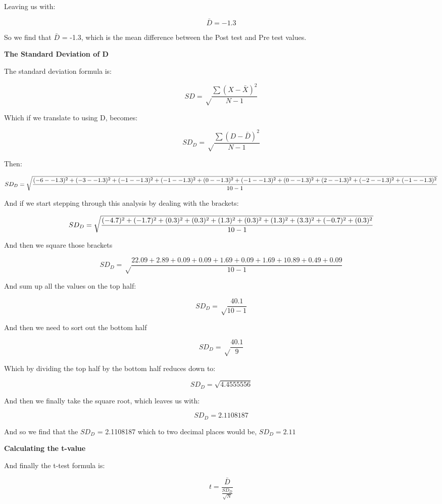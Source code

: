 \documentclass[
  oneside]{book}
\begin{document}
Leaving us with:

\[\bar{D} = -1.3\]

So we find that \(\bar{D}\) = -1.3, which is the mean difference between the Post test and Pre test values.

\textbf{The Standard Deviation of D}

The standard deviation formula is:

\[SD = \sqrt\frac{\sum(X - \bar{X})^2}{N-1}\]

Which if we translate to using D, becomes:

\[SD_{D} = \sqrt\frac{\sum(D - \bar{D})^2}{N-1}\]

Then:

\[SD_{D} =\sqrt\frac{(-6 - -1.3)^2 + (-3 - -1.3)^2 + (-1 - -1.3)^2 + (-1 - -1.3)^2 + (0 - -1.3)^2 + \\ (-1 - -1.3)^2 + (0 - -1.3)^2 + (2 - -1.3)^2 + (-2 - -1.3)^2 + (-1 - -1.3)^2}{10 - 1}\]

And if we start stepping through this analysis by dealing with the brackets:

\[SD_{D} =\sqrt\frac{(-4.7)^2 + (-1.7)^2 + (0.3)^2 + (0.3)^2 + (1.3)^2 + \\ (0.3)^2 + (1.3)^2 + (3.3)^2 + (-0.7)^2 + (0.3)^2}{10 - 1}\]

And then we square those brackets

\[SD_{D} =\sqrt\frac{22.09 + 2.89 + 0.09 + 0.09 + 1.69 + 0.09 + 1.69 + 10.89 + 0.49 + 0.09}{10 - 1}\]

And sum up all the values on the top half:

\[SD_{D} =\sqrt\frac{40.1}{10 - 1}\]

And then we need to sort out the bottom half

\[SD_{D} =\sqrt\frac{40.1}{9}\]

Which by dividing the top half by the bottom half reduces down to:

\[SD_{D} =\sqrt{4.4555556}\]

And then we finally take the square root, which leaves us with:

\[SD_{D} =2.1108187\]

And so we find that the \(SD_{D}\) = 2.1108187 which to two decimal places would be, \(SD_{D} = 2.11\)

\textbf{Calculating the t-value}

And finally the t-test formula is:

\[t = \frac{\bar{D}}{\frac{SD_{D}}{\sqrt{N}}}\]
\end{document}
